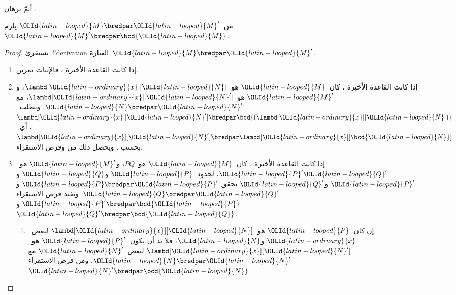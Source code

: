 \documentclass[../../../include/open-logic-section]{subfiles}
\begin{document}
\begin{prob}
  أتمّ برهان .
\end{prob}

\begin{lem}
  من~$\OLId{latin-looped}{M} \bredpar \OLId{latin-looped}{M}'$ يلزم~$\OLId{latin-looped}{M}' \bredpar \bcd{\OLId{latin-looped}{M}}$.
\end{lem}
\begin{proof}
  نستقرئ~!!{derivation} العبارة~$\OLId{latin-looped}{M} \bredpar \OLId{latin-looped}{M}'$.
  \begin{enumerate}
    \item إذا كانت القاعدة الأخيرة ، فالإثبات تمرين.
    \item إذا كانت القاعدة الأخيرة ، كان~$\OLId{latin-looped}{M}$
      هو~$\lambd[\OLId{latin-ordinary}{x}][\OLId{latin-looped}{N}]$، و$\OLId{latin-looped}{M}'$ هو~$\lambd[\OLId{latin-ordinary}{x}][\OLId{latin-looped}{N}']$، مع
      $\OLId{latin-looped}{N} \bredpar \OLId{latin-looped}{N}'$. ونطلب~$\lambd[\OLId{latin-ordinary}{x}][\OLId{latin-looped}{N}'] \bredpar
      \bcd{(\lambd[\OLId{latin-ordinary}{x}][\OLId{latin-looped}{N}])}$، أي~$\lambd[\OLId{latin-ordinary}{x}][\OLId{latin-looped}{N}'] \bredpar
      \lambd[\OLId{latin-ordinary}{x}][\bcd{\OLId{latin-looped}{N}}]$ بحسب .
      ويحصل ذلك من  وفرض الاستقراء.
    \item إذا كانت القاعدة الأخيرة ، كان~$\OLId{latin-looped}{M}$ هو~$PQ$،
      و$\OLId{latin-looped}{M}'$ هو~$\OLId{latin-looped}{P}'\OLId{latin-looped}{Q}'$، لحدود~$\OLId{latin-looped}{P}$ و$\OLId{latin-looped}{Q}$ و$\OLId{latin-looped}{P}'$ و$\OLId{latin-looped}{Q}'$ تحقق
      $\OLId{latin-looped}{P} \bredpar \OLId{latin-looped}{P}'$ و$\OLId{latin-looped}{Q} \bredpar \OLId{latin-looped}{Q}'$. ويفيد فرض الاستقراء
      $\OLId{latin-looped}{P}' \bredpar \bcd{\OLId{latin-looped}{P}}$ و$\OLId{latin-looped}{Q}' \bredpar \bcd{\OLId{latin-looped}{Q}}$.
      \begin{enumerate}
        \item إن كان~$\OLId{latin-looped}{P}$ هو~$\lambd[\OLId{latin-ordinary}{x}][\OLId{latin-looped}{N}]$ لبعض~$\OLId{latin-ordinary}{x}$ و$\OLId{latin-looped}{N}$،
          فلا بد أن يكون~$\OLId{latin-looped}{P}'$ هو~$\lambd[\OLId{latin-ordinary}{x}][\OLId{latin-looped}{N}']$ لبعض~$\OLId{latin-looped}{N}'$ مع
          $\OLId{latin-looped}{N} \bredpar \OLId{latin-looped}{N}'$. ومن فرض الاستقراء~$\OLId{latin-looped}{N}' \bredpar \bcd{\OLId{latin-looped}{N}}$

\end{enumerate}
\end{enumerate}
\end{proof}
\end{document}
